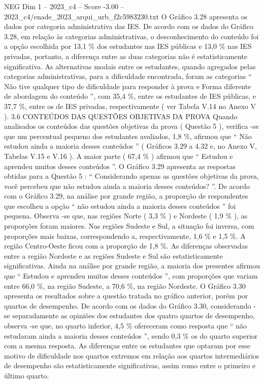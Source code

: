 \begin{textsample}{NEG Dim 1 – 2023\_c4 – Score -3.00 – 2023\_c4/enade\_2023\_arqui\_urb\_f2c5983230.txt}
O Gráfico 3.28 apresenta os dados por categoria administrativa das IES.
De acordo com os dados do Gráfico 3.28, em relação às categorias administrativas, o desconhecimento do conteúdo foi a opção escolhida por 13,1 \% dos estudantes nas IES públicas e 13,0 \% nas IES privadas, portanto, a diferença entre as duas categorias não é estatisticamente significativa.
As alternativas modais entre os estudantes, quando agregados pelas categorias administrativas, para a dificuldade encontrada, foram as categorias “ Não tive qualquer tipo de dificuldade para responder à prova e Forma diferente de abordagem do conteúdo ”, com 35,4 \%, entre os estudantes de IES públicas, e 37,7 \%, entre os de IES privadas, respectivamente ( ver Tabela V.14 no Anexo V ). 3.6 CONTEÚDOS DAS QUESTÕES OBJETIVAS DA PROVA Quando analisados os conteúdos das questões objetivas da prova ( Questão 5 ), verifica -se que um percentual pequeno dos estudantes avaliados, 1,8 \%, afirmou que “ Não estudou ainda a maioria desses conteúdos ” ( Gráficos 3.29 a 4.32 e, no Anexo V, Tabelas V.15 e V.16 ).
A maior parte ( 67,4 \% ) afirmou que “ Estudou e aprendeu muitos desses conteúdos ”.
O Gráfico 3.29 apresenta as respostas obtidas para a Questão 5 : “ Considerando apenas as questões objetivas da prova, você percebeu que não estudou ainda a maioria desses conteúdos? ”.
De acordo com o Gráfico 3.29, na análise por grande região, a proporção de respondentes que escolheu a opção “ não estudou ainda a maioria desses conteúdos ” foi pequena.
Observa -se que, nas regiões Norte ( 3,3 \% ) e Nordeste ( 1,9 \% ), as proporções foram maiores.
Nas regiões Sudeste e Sul, a situação foi inversa, com proporções mais baixas, correspondendo a, respectivamente, 1,6 \% e 1,5 \%.
A região Centro-Oeste ficou com a proporção de 1,8 \%.
As diferenças observadas entre a região Nordeste e as regiões Sudeste e Sul são estatisticamente significativas.
Ainda na análise por grande região, a maioria dos presentes afirmou que “ Estudou e aprendeu muitos desses conteúdos ”, com proporções que variam entre 66,0 \%, na região Sudeste, a 70,6 \%, na região Nordeste.
O Gráfico 3.30 apresenta os resultados sobre a questão tratada no gráfico anterior, porém por quartos de desempenho.
De acordo com os dados do Gráfico 3.30, considerando -se separadamente as opiniões dos estudantes dos quatro quartos de desempenho, observa -se que, no quarto inferior, 4,5 \% ofereceram como resposta que “ não estudaram ainda a maioria desses conteúdos ”, sendo 0,3 \% os do quarto superior com a mesma resposta.
As diferenças entre os estudantes que optaram por esse motivo de dificuldade nos quartos extremos em relação aos quartos intermediários de desempenho são estatisticamente significativas, assim como entre o primeiro e último quarto.

\end{textsample}
